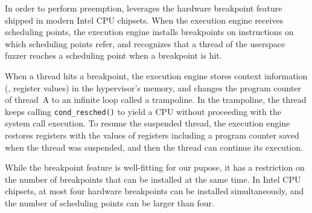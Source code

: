 






%
In order to perform preemption, \sys leverages the hardware breakpoint
feature~\cite{hwbp} shipped in modern Intel CPU chipsets.
%
When the execution engine receives scheduling points, the execution
engine installs breakpoints on instructions on which scheduling points
refer, and recognizes that a thread of the userspace fuzzer reaches a
scheduling point when a breakpoint is hit.


When a thread hits a breakpoint, the execution engine stores context
information (\eg, register values) in the hypervisor's memory, and
changes the program counter of thread~A to an infinite loop called a
trampoline.
%
In the trampoline, the thread keeps calling \texttt{cond_resched()} to
yield a CPU without proceeding with the system call execution.
%
To resume the suspended thread, the execution engine restores
registers with the values of registers including a program counter
saved when the thread was suspended, and then the thread can continue
its execution.






%
While the breakpoint feature is well-fitting for our pupose, it has a
restriction on the number of breakpoints that can be installed at the
same time.
%
In Intel CPU chipsets, at most four hardware breakpoints can be
installed simultaneously, and the number of scheduling points can be
larger than four.

